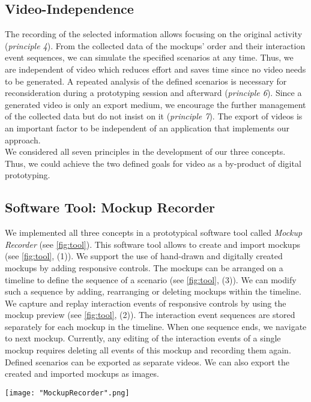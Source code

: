 \documentclass[conference]{IEEEtran}
\begin{document}
\subsection{Video-Independence}
The recording of the selected information allows focusing on the original 
activity (\textit{principle 4}). From the collected data of the mockups' order 
and their interaction event sequences, we can simulate the specified scenarios 
at any time. Thus, we are independent of video which reduces effort and saves 
time since no video needs to be generated. A repeated analysis of the 
defined scenarios is necessary for reconsideration during a prototyping 
session and afterward (\textit{principle 6}). Since a generated video is only 
an export medium, we encourage the further management of the collected data 
but do not insist on it (\textit{principle 7}). The export of videos is 
an important factor to be independent of an application that implements our 
approach.\\

We considered all seven principles in the development of our three concepts. 
Thus, we could achieve the two defined goals for video as a by-product of 
digital prototyping.

\subsection{Software Tool: Mockup Recorder}
We implemented all three concepts in a prototypical software tool called 
\textit{Mockup Recorder} (see \figurename{ \ref{fig:tool}}). This software tool 
allows to create and import mockups (see \figurename{ \ref{fig:tool}}, (1)). We 
support the use of hand-drawn and digitally created mockups by adding 
responsive controls. The mockups can be arranged on a timeline to define the 
sequence of a scenario (see \figurename{ \ref{fig:tool}, (3)}). We can modify 
such a sequence by adding, rearranging or deleting mockups within the timeline. 
We capture and replay interaction events of responsive controls by using the 
mockup preview (see \figurename{ \ref{fig:tool}}, (2)). The interaction event 
sequences are stored separately for each mockup in the timeline. When one 
sequence ends, we navigate to next mockup. Currently, any editing of the 
interaction events of a single mockup 
requires deleting all events of this mockup and recording them again. Defined 
scenarios can be exported as separate videos. We can also export the 
created and imported mockups as images.

\begin{figure*}[htbp]
	\centering
	\texttt{[image: "MockupRecorder".png]}\hfill
	\caption{Mockup Recorder: 'Selection of existing mockups' (1), 
		'Mockup preview to capture and replay interaction' (2) and 'Timeline of 
		a scenario' (3)}
	\label{fig:tool}
\end{figure*}
\end{document}
